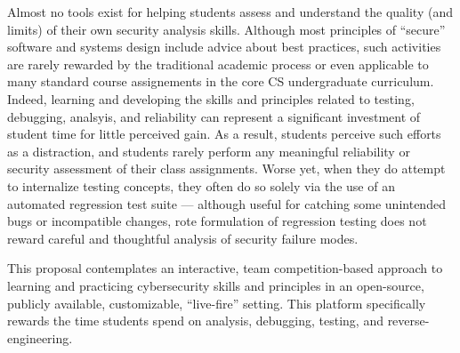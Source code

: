 \documentclass[11pt]{report}
\begin{document}
Almost no tools exist for helping students assess and
understand the quality (and limits) of their own security analysis
skills.  Although most principles of ``secure'' software and systems
design include advice about best practices, such activities are rarely
rewarded by the traditional academic process or even applicable to
many standard course assignements in the core CS undergraduate
curriculum.  Indeed, learning and developing the skills and principles
related to testing, debugging, analsyis, and reliability can represent
a significant investment of student time for little perceived gain. As
a result, students perceive such efforts as a distraction, and
students rarely perform any meaningful reliability or security
assessment of their class assignments.  Worse yet, when they do
attempt to internalize testing concepts, they often do so solely via
the use of an automated regression test suite --- although useful for
catching some unintended bugs or incompatible changes, rote
formulation of regression testing does not reward careful and
thoughtful analysis of security failure modes.

This proposal contemplates an interactive, team competition-based
approach to learning and practicing cybersecurity skills and
principles in an open-source, publicly available, customizable,
``live-fire'' setting.  This platform specifically rewards the time
students spend on analysis, debugging, testing, and
reverse-engineering.  


\end{document}
